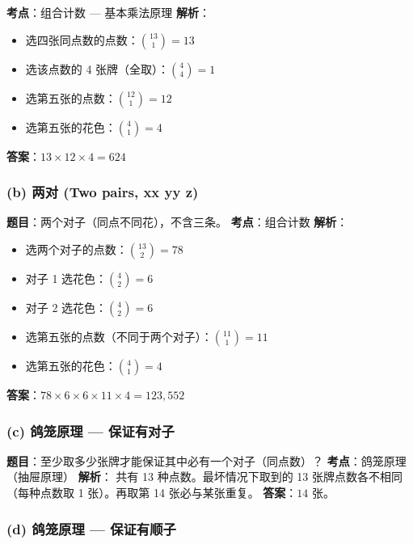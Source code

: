 \documentclass[10pt,a4paper,openany]{ctexbook}
\theoremstyle{definition}
\theoremstyle{remark}
\begin{document}
\textbf{考点}：组合计数 — 基本乘法原理
\textbf{解析}：
\begin{itemize}
\item 选四张同点数的点数：$\binom{13}{1} = 13$
\item 选该点数的 4 张牌（全取）：$\binom{4}{4} = 1$
\item 选第五张的点数：$\binom{12}{1} = 12$
\item 选第五张的花色：$\binom{4}{1} = 4$

\end{itemize}

\textbf{答案}：$13 \times 12 \times 4 = \boxed{624}$
\vspace{-2pt}

\subsubsection{(b) 两对 (Two pairs, xx yy z)}

\textbf{题目}：两个对子（同点不同花），不含三条。
\textbf{考点}：组合计数
\textbf{解析}：
\begin{itemize}
\item 选两个对子的点数：$\binom{13}{2} = 78$
\item 对子 1 选花色：$\binom{4}{2} = 6$
\item 对子 2 选花色：$\binom{4}{2} = 6$
\item 选第五张的点数（不同于两个对子）：$\binom{11}{1} = 11$
\item 选第五张的花色：$\binom{4}{1} = 4$

\end{itemize}

\textbf{答案}：$78 \times 6 \times 6 \times 11 \times 4 = \boxed{123,552}$
\vspace{-2pt}

\subsubsection{(c) 鸽笼原理 — 保证有对子}

\textbf{题目}：至少取多少张牌才能保证其中必有一个对子（同点数）？
\textbf{考点}：鸽笼原理（抽屉原理）
\textbf{解析}：
共有 13 种点数。最坏情况下取到的 13 张牌点数各不相同（每种点数取 1 张）。再取第 14 张必与某张重复。
\textbf{答案}：$\boxed{14}$ 张。
\vspace{-2pt}

\subsubsection{(d) 鸽笼原理 — 保证有顺子}
\end{document}
